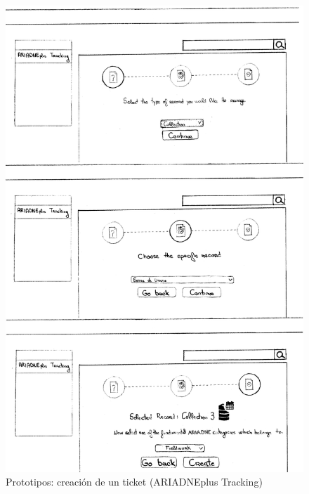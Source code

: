 \documentclass[
]{article}
\begin{document}
\begin{figure}
\hypertarget{new-prototipe}{%
\centering
\includegraphics{../_static/images/new-prototipe.png}
\caption{Prototipos: creación de un ticket (ARIADNEplus
Tracking)}\label{new-prototipe}
}
\end{figure}
\end{document}
